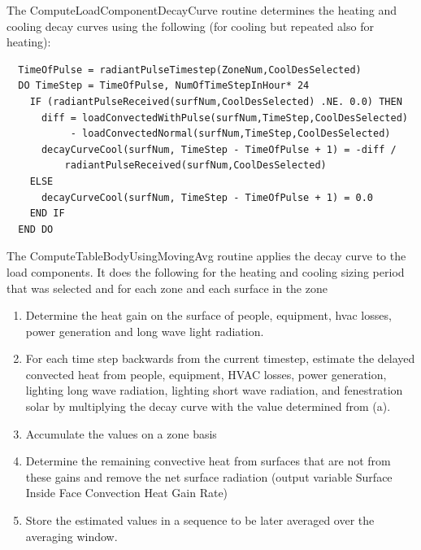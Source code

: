 The ComputeLoadComponentDecayCurve routine determines the heating and cooling decay curves using the following (for cooling but repeated also for heating):

\begin{lstlisting}
  TimeOfPulse = radiantPulseTimestep(ZoneNum,CoolDesSelected)
  DO TimeStep = TimeOfPulse, NumOfTimeStepInHour* 24
    IF (radiantPulseReceived(surfNum,CoolDesSelected) .NE. 0.0) THEN
      diff = loadConvectedWithPulse(surfNum,TimeStep,CoolDesSelected)
           - loadConvectedNormal(surfNum,TimeStep,CoolDesSelected)
      decayCurveCool(surfNum, TimeStep - TimeOfPulse + 1) = -diff /
          radiantPulseReceived(surfNum,CoolDesSelected)
    ELSE
      decayCurveCool(surfNum, TimeStep - TimeOfPulse + 1) = 0.0
    END IF
  END DO
\end{lstlisting}

The ComputeTableBodyUsingMovingAvg routine applies the decay curve to the load components. It does the following for the heating and cooling sizing period that was selected and for each zone and each surface in the zone

\begin{enumerate}
\def\labelenumi{\arabic{enumi}.}
\item
  Determine the heat gain on the surface of people, equipment, hvac losses, power generation and long wave light radiation.
\item
  For each time step backwards from the current timestep, estimate the delayed convected heat from people, equipment, HVAC losses, power generation, lighting long wave radiation, lighting short wave radiation, and fenestration solar by multiplying the decay curve with the value determined from (a).
\item
  Accumulate the values on a zone basis
\item
  Determine the remaining convective heat from surfaces that are not from these gains and remove the net surface radiation (output variable Surface Inside Face Convection Heat Gain Rate)
\item
  Store the estimated values in a sequence to be later averaged over the averaging window.
\end{enumerate}
